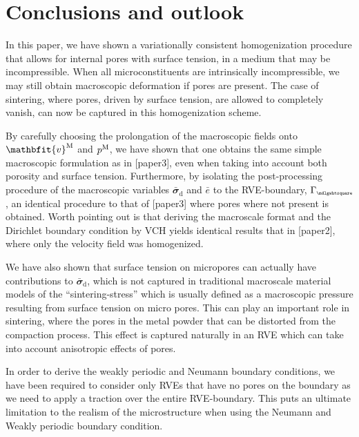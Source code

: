 \documentclass[12pt,a4paper]{article}
\renewcommand{\ta}[1]{\mathbfit{#1}}
\renewcommand{\ts}[1]{\mathbfit{#1}}
\renewcommand{\Box}{\mdlgwhtsquare}
\renewcommand{\dev}{\mathrm{d}}
\newcommand{\rve}{
  {\mathchoice
   {\mbox{\scalebox{0.67}{$\Box$}}}
   {\mbox{\scalebox{0.67}{$\Box$}}}
   {\mbox{\scalebox{0.5}{$\Box$}}}
   {\mbox{\scalebox{0.375}{$\Box$}}}
  }
}
\begin{document}
\section{Conclusions and outlook}

In this paper, we have shown a variationally consistent homogenization procedure that allows for internal pores with surface tension, in a medium that may be incompressible.
When all microconstituents are intrinsically incompressible, we may still obtain macroscopic deformation if pores are present.
The case of sintering, where pores, driven by surface tension, are allowed to completely vanish, can now be captured in this homogenization scheme. 

By carefully choosing the prolongation of the macroscopic fields onto $\ta v^\macro$ and $p^{\mathrm{M}}$, we have shown that one obtains the same simple macroscopic formulation as in [paper3], even when taking into account both porosity and surface tension.
Furthermore, by isolating the post-processing procedure of the macroscopic variables $\bar{\ts\sigma}_\dev$ and $\bar{e}$ to the RVE-boundary, $\Gamma_\rve$, an identical procedure to that of [paper3] where pores where not present is obtained.
Worth pointing out is that deriving the macroscale format and the Dirichlet boundary condition by VCH yields identical results that in [paper2], where only the velocity field was homogenized.


We have also shown that surface tension on micropores can actually have contributions to $\bar{\ts\sigma}_\dev$, which is not captured in traditional macroscale material models of the ``sintering-stress'' which is usually defined as a macroscopic pressure resulting from surface tension on micro pores.
This can play an important role in sintering, where the pores in the metal powder that can be distorted from the compaction process.
This effect is captured naturally in an RVE which can take into account anisotropic effects of pores.


In order to derive the weakly periodic and Neumann boundary conditions, we have been required to consider only RVEs that have no pores on the boundary as we need to apply a traction over the entire RVE-boundary.
This puts an ultimate limitation to the realism of the microstructure when using the Neumann and Weakly periodic boundary condition.
\end{document}
